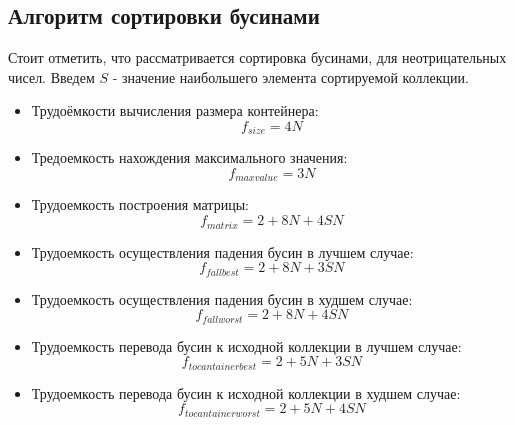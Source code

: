 \subsection{Алгоритм сортировки бусинами}


Стоит отметить, что рассматривается сортировка бусинами, для
неотрицательных чисел. Введем $S$ - значение наибольшего элемента
сортируемой коллекции.


\begin{itemize}
    \item Трудоёмкости вычисления размера контейнера:
    \begin{equation}
        \label{for:bedads_container_size}
        f_{size} = 4N
    \end{equation}
    \item Тредоемкость нахождения максимального значения:
    \begin{equation}
        \label{for:selection_inner}
        f_{max value} = 3N
    \end{equation}
    \item Трудоемкость построения матрицы:
    \begin{equation}
        \label{for:selection_if}
        f_{matrix} = 2 + 8N + 4SN
    \end{equation}
    \item Трудоемкость осуществления падения бусин в лучшем случае:
    \begin{equation}
        \label{for:fallbest}
        f_{fallbest} = 2 + 8N + 3SN
    \end{equation}
    \item Трудоемкость осуществления падения бусин в худшем случае:
    \begin{equation}
        \label{for:fallworst}
        f_{fallworst} = 2 + 8N + 4SN
    \end{equation}
    \item Трудоемкость перевода бусин к исходной коллекции в лучшем случае:
    \begin{equation}
        \label{for:tocontainerbest}
        f_{tocantainerbest} = 2 + 5N + 3SN
    \end{equation}
    \item Трудоемкость перевода бусин к исходной коллекции в худшем случае:
    \begin{equation}
        \label{for:tocontainerworst}
        f_{tocantainerworst} = 2 + 5N + 4SN
    \end{equation}
\end{itemize}

